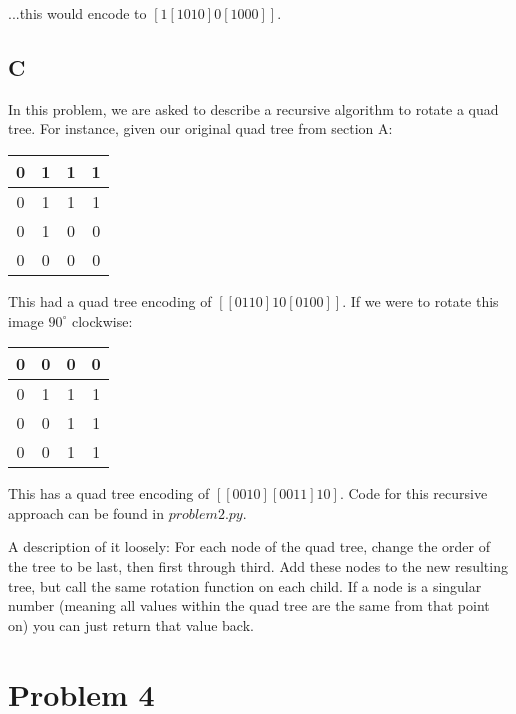 \documentclass{article}
\begin{document}
\noindent ...this would encode to $[1[1010]0[1000]]$.

\subsection*{C}

In this problem, we are asked to describe a recursive algorithm to rotate a quad tree. For instance, given our original quad tree from section A:

\begin{center}
    \begin{tabular}{ | c | c | c | c | }
        \hline
        0 & 1 & 1 & 1 \\ 
        \hline
        0 & 1 & 1 & 1 \\ 
        \hline
        0 & 1 & 0 & 0 \\ 
        \hline
        0 & 0 & 0 & 0 \\ 
        \hline  
    \end{tabular}
\end{center}

\noindent This had a quad tree encoding of $[[0110]10[0100]]$. If we were to rotate this image $90^\circ$ clockwise:

\begin{center}
    \begin{tabular}{ | c | c | c | c | }
        \hline
        0 & 0 & 0 & 0 \\ 
        \hline
        0 & 1 & 1 & 1 \\
        \hline
        0 & 0 & 1 & 1 \\
        \hline
        0 & 0 & 1 & 1 \\
        \hline
    \end{tabular}
\end{center}

\noindent This has a quad tree encoding of $[[0010][0011]10]$. Code for this recursive approach can be found in $problem2.py$.

A description of it loosely: For each node of the quad tree, change the order of the tree to be last, then first through third. Add these nodes to the new resulting tree, but call the same rotation function on each child. If a node is a singular number (meaning all values within the quad tree are the same from that point on) you can just return that value back.


\section*{Problem 4}
\end{document}
